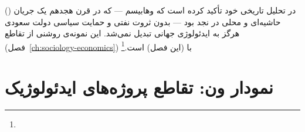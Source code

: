  () در تحلیل تاریخی خود تأکید کرده است که وهابیسم — که در قرن هجدهم یک جریان حاشیه‌ای و محلی در نجد بود — بدون ثروت نفتی و حمایت سیاسی دولت سعودی هرگز به ایدئولوژی جهانی تبدیل نمی‌شد. این نمونه‌ی روشنی از تقاطع  (فصل~\ref{ch:sociology-economics}) با  (این فصل) است.\footnote{}


\section{نمودار ون: تقاطع پروژه‌های ایدئولوژیک}
\label{sec:ch13-venn}


